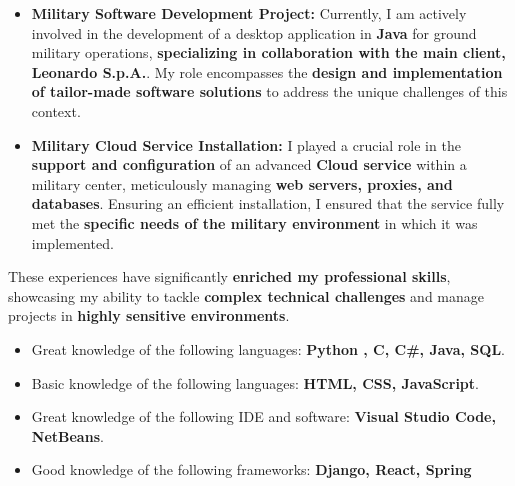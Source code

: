 \documentclass[10pt,a4paper]{altacv}
\begin{document}
\begin{itemize}
    \item \textbf{Military Software Development Project:} Currently, I am actively involved in the development of a desktop application in \textbf{Java} for ground military operations, \textbf{specializing in collaboration with the main client, Leonardo S.p.A.}. My role encompasses the \textbf{design and implementation of tailor-made software solutions} to address the unique challenges of this context.

    \item \textbf{Military Cloud Service Installation:} I played a crucial role in the \textbf{support and configuration} of an advanced \textbf{Cloud service} within a military center, meticulously managing \textbf{web servers, proxies, and databases}. Ensuring an efficient installation, I ensured that the service fully met the \textbf{specific needs of the military environment} in which it was implemented.
\end{itemize}

These experiences have significantly \textbf{enriched my professional skills}, showcasing my ability to tackle \textbf{complex technical challenges} and manage projects in \textbf{highly sensitive environments}.



\begin{itemize}
  \item Great knowledge of the following  languages: \textbf{Python , C, C\#, Java, SQL}.
  \item Basic knowledge of the following languages: \textbf{HTML, CSS, JavaScript}.
  \item Great knowledge of the following IDE and software: \textbf{Visual Studio Code, NetBeans}.
  \item Good knowledge of the following frameworks: \textbf{Django, React, Spring}

  
\end{itemize}



\end{document}
